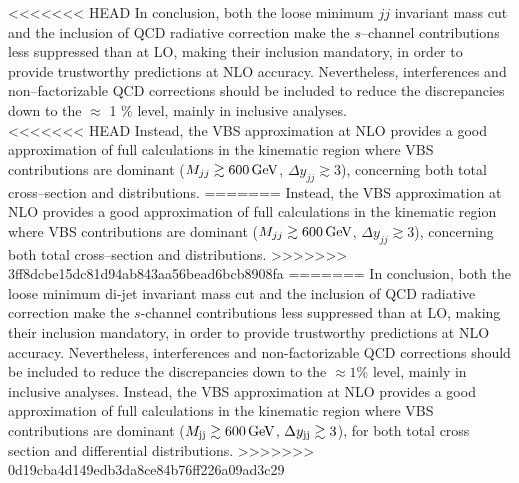<<<<<<< HEAD
In conclusion, both the loose minimum $jj$ invariant mass cut and the inclusion of QCD radiative correction make the $s$--channel contributions less suppressed than at LO, making their inclusion mandatory, in order to provide trustworthy predictions at NLO accuracy. Nevertheless, interferences and non--factorizable QCD corrections should be included to reduce the discrepancies down to the $\approx$ 1 \%  level, mainly in inclusive analyses.\\
<<<<<<< HEAD
Instead, the VBS approximation at NLO provides a good approximation of full calculations in the kinematic region where VBS contributions are dominant ($M_{jj} \gtrsim 600 \,\text{GeV}$, $\Delta y_{jj} \gtrsim 3$), concerning both total cross--section and distributions. 
=======
Instead, the VBS approximation at NLO provides a good approximation of full calculations in the kinematic region where VBS contributions are dominant ($M_{jj} \gtrsim 600 \,\text{GeV}$, $\Delta y_{jj} \gtrsim 3$), concerning both total cross--section and distributions.
>>>>>>> 3ff8dcbe15dc81d94ab843aa56bead6bcb8908fa
=======
In conclusion, both the loose minimum di-jet invariant mass cut and the inclusion of QCD radiative correction make the $s$-channel contributions less suppressed than at LO, making their inclusion mandatory, in order to provide trustworthy predictions at NLO accuracy.
Nevertheless, interferences and non-factorizable QCD corrections should be included to reduce the discrepancies down to the $\approx 1\%$  level, mainly in inclusive analyses.
Instead, the VBS approximation at NLO provides a good approximation of full calculations in the kinematic region where VBS contributions are dominant ($M_{\text{j}\text{j}} \gtrsim 600 \,\text{GeV}$, $\Delta y_{\text{j}\text{j}} \gtrsim 3$), for both total cross section and differential distributions.
>>>>>>> 0d19cba4d149edb3da8ce84b76ff226a09ad3c29
